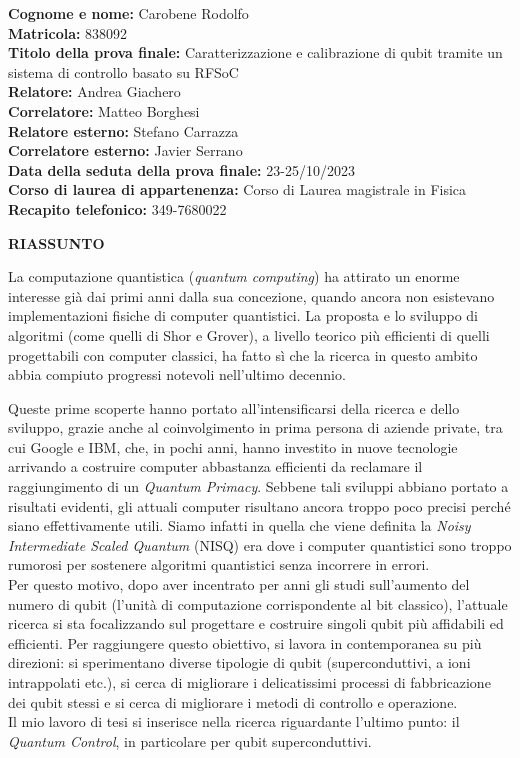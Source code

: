 \documentclass{article}
\begin{document}
\textbf{Cognome e nome: } Carobene Rodolfo\\
\textbf{Matricola: } 838092\\
\textbf{Titolo della prova finale: } Caratterizzazione e calibrazione di qubit tramite un sistema di controllo basato su RFSoC\\
\textbf{Relatore: } Andrea Giachero\\
\textbf{Correlatore: } Matteo Borghesi\\
\textbf{Relatore esterno: } Stefano Carrazza\\
\textbf{Correlatore esterno: } Javier Serrano\\
\textbf{Data della seduta della prova finale: }23-25/10/2023\\
\textbf{Corso di laurea di appartenenza: } Corso di Laurea magistrale in Fisica\\
\textbf{Recapito telefonico: } 349-7680022\\

\begin{center}
    \textbf{RIASSUNTO}
\end{center} 

La computazione quantistica (\textit{quantum computing}) ha attirato un enorme interesse già dai primi anni dalla sua concezione, quando ancora non esistevano implementazioni fisiche di computer quantistici.
La proposta e lo sviluppo di algoritmi (come quelli di Shor e Grover), a livello teorico più efficienti di quelli progettabili con computer classici, ha fatto sì che la ricerca in questo ambito abbia compiuto progressi notevoli nell'ultimo decennio.

Queste prime scoperte hanno portato all'intensificarsi della ricerca e dello sviluppo, grazie anche al coinvolgimento in prima persona di aziende private, tra cui Google e IBM, che, in pochi anni, hanno investito in nuove tecnologie arrivando a costruire computer abbastanza efficienti da reclamare il raggiungimento di un \textit{Quantum Primacy}.
%
Sebbene tali sviluppi abbiano portato a risultati evidenti, gli attuali computer risultano ancora troppo poco precisi perché siano effettivamente utili.
Siamo infatti in quella che viene definita la \textit{Noisy Intermediate Scaled Quantum} (NISQ) era dove i computer quantistici sono troppo rumorosi per sostenere algoritmi quantistici senza incorrere in errori.\\
%
Per questo motivo, dopo aver incentrato per anni gli studi sull'aumento del numero di qubit (l'unità di computazione corrispondente al bit classico), l'attuale ricerca si sta focalizzando sul progettare e costruire singoli qubit più affidabili ed efficienti.
%
Per raggiungere questo obiettivo, si lavora in contemporanea su più direzioni: si sperimentano diverse tipologie di qubit (superconduttivi, a ioni intrappolati etc.), si cerca di migliorare i delicatissimi processi di fabbricazione dei qubit stessi e si cerca di migliorare i metodi di controllo e operazione.\\
%
Il mio lavoro di tesi si inserisce nella ricerca riguardante l'ultimo punto: il \textit{Quantum Control}, in particolare per qubit superconduttivi.
\end{document}
